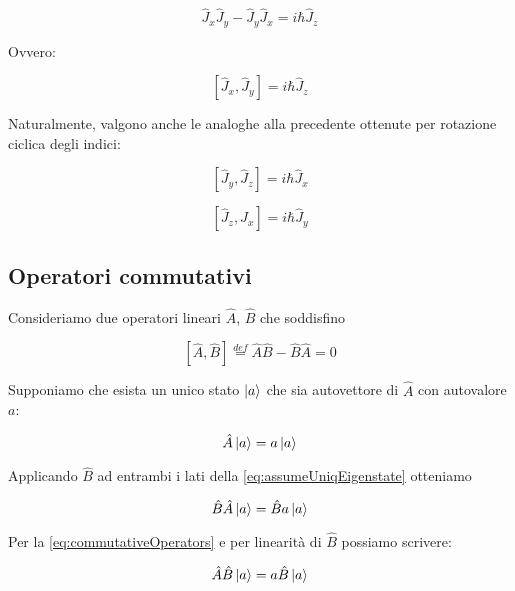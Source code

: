 	\begin{equation}
		\hat{J}_x \hat{J}_y - \hat{J}_y \hat{J}_x = i \hbar \hat{J}_z
	\end{equation}

Ovvero:

	\begin{equation}
		\left [ \hat{J}_x, \hat{J}_y \right ] = i \hbar \hat{J}_z
	\end{equation}

Naturalmente, valgono anche le analoghe alla precedente ottenute per rotazione ciclica degli indici:

	\begin{equation}
		\left [ \hat{J}_y, \hat{J}_z \right ] = i \hbar \hat{J}_x
	\end{equation}

	\begin{equation}
		\left [ \hat{J}_z, \hat{J}_x \right ] = i \hbar \hat{J}_y
	\end{equation}

\subsection{Operatori commutativi}

Consideriamo due operatori lineari $\hat{A}$, $\hat{B}$ che soddisfino

	\begin{equation} \label{eq:commutativeOperators}
		\left [ \hat{A}, \hat{B} \right ] \overset{def}{=} \hat{A}\hat{B} - \hat{B}\hat{A} = 0
	\end{equation}

Supponiamo che esista un unico stato $\ket{a}$ che sia autovettore di $\hat{A}$ con autovalore $a$:

	\begin{equation} \label{eq:assumeUniqEigenstate}
		\hat{A}\ket{a} = a \ket{a}
	\end{equation}

Applicando $\hat{B}$ ad entrambi i lati della \eqref{eq:assumeUniqEigenstate} otteniamo

	\begin{equation}
		\hat{B}\hat{A}\ket{a} = \hat{B}a\ket{a}
	\end{equation}

Per la \eqref{eq:commutativeOperators} e per linearit\`a di $\hat{B}$ possiamo scrivere:

	\begin{equation}
		\hat{A}\hat{B} \ket{a} = a \hat{B} \ket{a}
	\end{equation}

